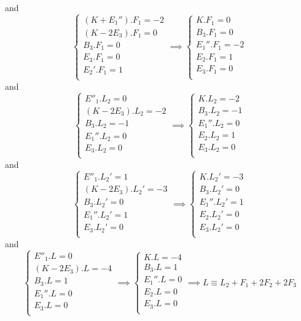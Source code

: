 \documentclass{article}
\begin{document}
and
\[
\begin{cases}
	(K+E_1'').F_1=-2\\
	(K-2E_3).F_1=0\\
	B_3.F_1=0\\
	E_3.F_1=0\\
	E_2'.F_1=1\\
\end{cases}
\implies
\begin{cases}
	K.F_1=0\\
	B_3.F_1=0\\
	E_1''.F_1=-2\\
	E_2.F_1=1\\
	E_3.F_1=0\\
\end{cases}
\]
and
\[
\begin{cases}
	E''_1.L_2=0\\
	(K-2E_3).L_2=-2\\
	B_3.L_2=-1\\
	E_1''.L_2=0\\
	E_3.L_2=0\\
\end{cases}
\implies
\begin{cases}
	K.L_2=-2\\
	B_3.L_2=-1\\
	E_1''.L_2=0\\
	E_2.L_2 = 1\\
	E_3.L_2=0\\
\end{cases}
\]
and
\[
\begin{cases}
	E''_1.L_2' =1\\
	(K-2E_3).L_2'=- 3\\
	B_3.L_2' = 0\\
	E_1''.L_2' = 1\\
	E_3.L_2'=0\\
\end{cases}
\implies
\begin{cases}
	K.L_2'=- 3\\
	B_3.L_2' = 0\\
	E_1''.L_2' = 1\\
	E_2.L_2' = 0 \\
	E_3.L_2'=0\\
\end{cases}
\]
and
\[
\begin{cases}
	E''_1.L=0\\
	(K-2E_3).L=- 4\\
	B_3.L = 1\\
	E_1''.L=0\\
	E_3.L=0\\
\end{cases}
\implies
\begin{cases}
	K.L=- 4\\
	B_3.L =1\\
	E_1''.L=0\\
	E_2.L = 0\\
	E_3.L=0\\
\end{cases}
\implies
L\equiv L_2 + F_1 + 2F_2 + 2F_3
\]
\end{document}
